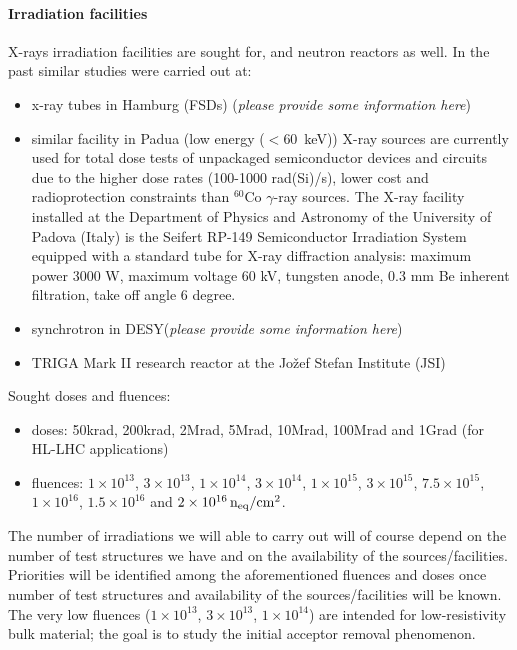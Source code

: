 \documentclass[dvips,12pt]{article}
\begin{document}
\paragraph{Irradiation facilities}
X-rays irradiation facilities are sought for, and neutron reactors as well.
In the past similar studies were carried out at:
\begin{itemize}
\item x-ray tubes in Hamburg (FSDs) ({\it please provide some information here})
\item similar facility in Padua (low energy ($<$60~keV)) X-ray sources are currently used for total dose tests of unpackaged semiconductor devices and circuits due to the higher dose rates (100-1000 rad(Si)/s), lower cost and radioprotection constraints than $^{60}$Co $\gamma$-ray sources.
The X-ray facility installed at the Department of Physics and Astronomy of the University of Padova (Italy) is the Seifert RP-149 Semiconductor Irradiation System equipped with a standard tube for X-ray diffraction analysis: maximum power 3000 W, maximum voltage 60 kV, tungsten anode, 0.3 mm Be inherent filtration, take off angle 6 degree. 
\item synchrotron in DESY({\it please provide some information here})
\item TRIGA Mark II research reactor at the Jo\v{z}ef Stefan Institute (JSI)  
\end{itemize}
\noindent Sought doses and fluences:
\begin{itemize}
\item doses: 50krad, 200krad, 2Mrad, 5Mrad, 10Mrad, 100Mrad and 1Grad (for HL-LHC 
applications)
\item fluences: $1\times10^{13}$,  $3\times10^{13}$, $1\times10^{14}$, $3\times10^{14}$, 
$1\times10^{15}$, $3\times10^{15}$, $7.5\times10^{15}$, $1\times10^{16}$, $1.5\times10^{16}$ and 
$2\times10^{16}\,{\rm n_{eq}/cm^2}$.
\end{itemize}

\noindent The number of irradiations we will able to carry out will of course depend on the 
number of test structures we have and on the availability of the sources/facilities. Priorities 
will be identified among the aforementioned fluences and doses once number of test structures 
and  availability of the sources/facilities will be known. 
\noindent The very low fluences ($1\times10^{13}$,  
$3\times10^{13}$, $1\times10^{14}$) are intended for low-resistivity bulk material; the goal 
is to study the initial acceptor removal phenomenon. 
\end{document}
